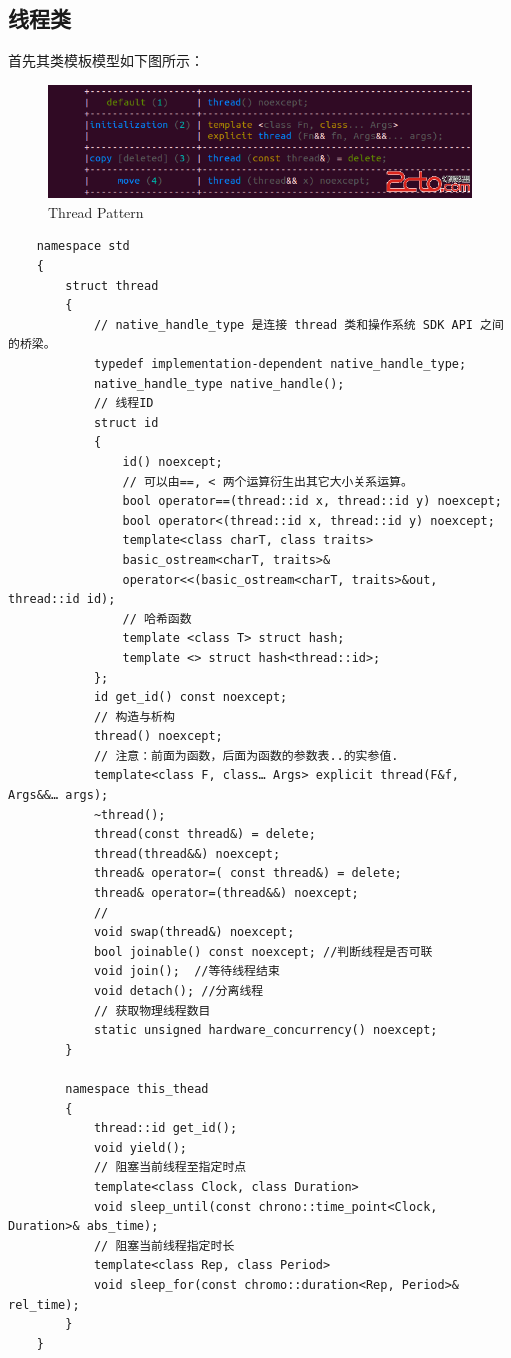 \documentclass[UTF8,a4paper,12pt]{ctexbook}
\begin{document}
	\subsection{线程类}
		首先其类模板模型如下图所示：
		\begin{figure}[h]
			\centering
			\includegraphics[scale= 0.8]{thread.png}
			\caption{Thread Pattern}
		\end{figure}
		\begin{lstlisting}
	namespace std
	{
		struct thread
		{
			// native_handle_type 是连接 thread 类和操作系统 SDK API 之间的桥梁。
			typedef implementation-dependent native_handle_type;
			native_handle_type native_handle();
			// 线程ID
			struct id
			{
				id() noexcept;
				// 可以由==, < 两个运算衍生出其它大小关系运算。
				bool operator==(thread::id x, thread::id y) noexcept;
				bool operator<(thread::id x, thread::id y) noexcept;
				template<class charT, class traits>
				basic_ostream<charT, traits>&
				operator<<(basic_ostream<charT, traits>&out, thread::id id);
				// 哈希函数
				template <class T> struct hash;
				template <> struct hash<thread::id>;
			};
			id get_id() const noexcept;
			// 构造与析构
			thread() noexcept;
			// 注意：前面为函数，后面为函数的参数表..的实参值.
			template<class F, class… Args> explicit thread(F&f, Args&&… args);
			~thread();
			thread(const thread&) = delete;
			thread(thread&&) noexcept;
			thread& operator=( const thread&) = delete;
			thread& operator=(thread&&) noexcept;
			//
			void swap(thread&) noexcept;
			bool joinable() const noexcept; //判断线程是否可联
			void join();  //等待线程结束
			void detach(); //分离线程
			// 获取物理线程数目
			static unsigned hardware_concurrency() noexcept;
		}
		
		namespace this_thead
		{
			thread::id get_id();
			void yield();
			// 阻塞当前线程至指定时点
			template<class Clock, class Duration>
			void sleep_until(const chrono::time_point<Clock, Duration>& abs_time);
			// 阻塞当前线程指定时长
			template<class Rep, class Period>
			void sleep_for(const chromo::duration<Rep, Period>& rel_time);
		}
	}	
		\end{lstlisting}
		
\end{document}
